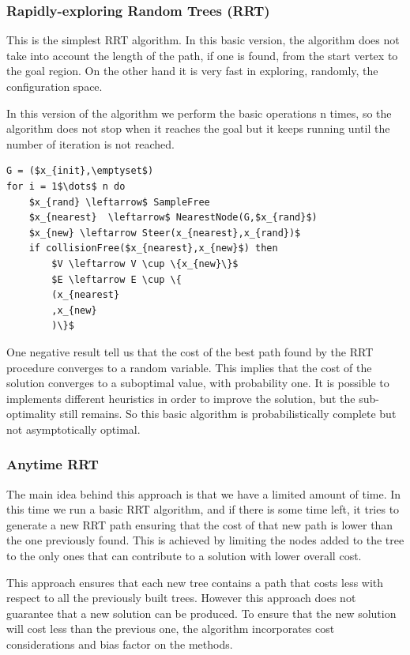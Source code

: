 \documentclass[10pt]{article}
\begin{document}
	\subsubsection{Rapidly-exploring Random Trees (RRT)}
	
	This is the simplest RRT algorithm. In this basic version, the algorithm does not take into account the length of the path, if one is found, from the start vertex to the goal region. On the other hand it is very fast in exploring, randomly, the configuration space.

	In this version of the algorithm we perform the basic operations n times, so the algorithm does not stop when it reaches the goal but it keeps running until the number of iteration is not reached. 
	\begin{lstlisting}[frame=single, mathescape=true,caption={RRT}]
G = ($x_{init},\emptyset$)
for i = 1$\dots$ n do
	$x_{rand} \leftarrow$ SampleFree
	$x_{nearest}  \leftarrow$ NearestNode(G,$x_{rand}$)
	$x_{new} \leftarrow Steer(x_{nearest},x_{rand})$	
	if collisionFree($x_{nearest},x_{new}$) then
		$V \leftarrow V \cup \{x_{new}\}$
		$E \leftarrow E \cup \{
		(x_{nearest}
		,x_{new}
		)\}$
	\end{lstlisting}
	
	One negative result tell us that the cost of the best path found by the RRT procedure converges to a random variable. This implies that the cost of the solution converges to a suboptimal value, with probability one. It is possible to implements different heuristics in order to improve the solution, but the sub-optimality still remains. So this basic algorithm is probabilistically complete but not asymptotically optimal.
	
	\subsubsection{Anytime RRT}
	
	The main idea behind this approach is that we have a limited amount of time. In this time we run a basic RRT algorithm, and if there is some time left, it tries to generate a new RRT path ensuring that the cost of that new path is lower than the one previously found. This is achieved by limiting the nodes added to the tree to the only ones that can contribute to a solution with lower overall cost. 
	
	This approach ensures that each new tree contains a path that costs less with respect to all the previously built trees. However this approach does not guarantee that a new solution can be produced. To ensure that the new solution will cost less than the previous one, the algorithm incorporates cost considerations and bias factor on the methods.
	
\end{document}
